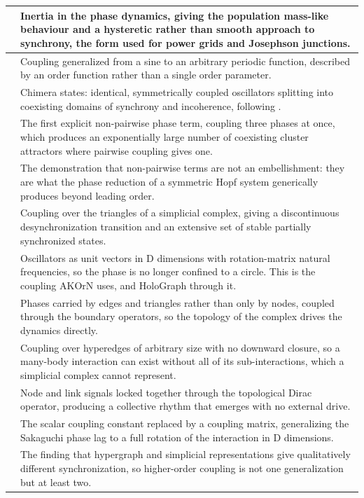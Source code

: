 \documentclass[a4paper,fleqn]{cas-sc}
\begin{document}
\begin{longtable}[]{@{}
  >{\raggedright\arraybackslash}p{}
  >{\raggedright\arraybackslash}p{}@{}}
\cmidrule{1-2}\citet{ermentrout1991} & Inertia in the phase dynamics,
giving the population mass-like behaviour and a hysteretic rather than
smooth approach to synchrony, the form used for power grids and
Josephson junctions. \\
\cmidrule{1-2}\citet{daido1992} & Coupling generalized from a sine to an
arbitrary periodic function, described by an order function rather than
a single order parameter. \\
\cmidrule{1-2}\citet{abrams2004} & Chimera states: identical,
symmetrically coupled oscillators splitting into coexisting domains of
synchrony and incoherence, following \citet{kuramoto2002}. \\
\cmidrule{1-2}\citet{tanaka2011} & The first explicit non-pairwise phase
term, coupling three phases at once, which produces an exponentially
large number of coexisting cluster attractors where pairwise coupling
gives one. \\
\cmidrule{1-2}\citet{ashwin2016} & The demonstration that non-pairwise
terms are not an embellishment: they are what the phase reduction of a
symmetric Hopf system generically produces beyond leading order. \\
\cmidrule{1-2}\citet{skardal2019} & Coupling over the triangles of a
simplicial complex, giving a discontinuous desynchronization transition
and an extensive set of stable partially synchronized states. \\
\cmidrule{1-2}\citet{chandra2019} & Oscillators as unit vectors in D
dimensions with rotation-matrix natural frequencies, so the phase is no
longer confined to a circle. This is the coupling AKOrN uses, and
HoloGraph through it. \\
\cmidrule{1-2}\citet{millan2020} & Phases carried by edges and triangles
rather than only by nodes, coupled through the boundary operators, so
the topology of the complex drives the dynamics directly. \\
\cmidrule{1-2}\citet{mulas2020} & Coupling over hyperedges of arbitrary
size with no downward closure, so a many-body interaction can exist
without all of its sub-interactions, which a simplicial complex cannot
represent. \\
\cmidrule{1-2}\citet{calmon2022} & Node and link signals locked together
through the topological Dirac operator, producing a collective rhythm
that emerges with no external drive. \\
\cmidrule{1-2}\citet{de-aguiar2023} & The scalar coupling constant
replaced by a coupling matrix, generalizing the Sakaguchi phase lag to a
full rotation of the interaction in D dimensions. \\
\cmidrule{1-2}\citet{zhang2023} & The finding that hypergraph and
simplicial representations give qualitatively different synchronization,
so higher-order coupling is not one generalization but at least two. \\
\end{longtable}
\end{document}
